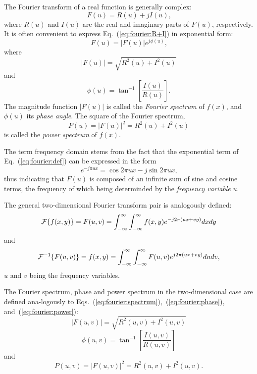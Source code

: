 The Fourier transform of a real function is generally complex:
\begin{equation}
\label{eq:fourier:R+I}
F(u)=R(u)+jI(u)\mbox{,}
\end{equation}
where $R(u)$ and $I(u)$ are the real and imaginary parts of $F(u)$,
respectively.  It is often convenient to express
Eq.~(\ref{eq:fourier:R+I}) in exponential form:
\begin{equation}
  F(u)=|F(u)|e^{j\phi(u)}\mbox{,}
\end{equation}
where
\begin{equation}
\label{eq:fourier:spectrum}
|F(u)|=\sqrt{R^{2}(u)+I^{2}(u)}
\end{equation}
and
\begin{equation}
\label{eq:fourier:phase}
\phi(u)=\tan^{-1}\left[\frac{I(u)}{R(u)}\right]\mbox{.}
\end{equation}
The magnitude function $|F(u)|$ is called the {\em Fourier spectrum\/}
of $f(x)$, and $\phi(u)$ its {\em phase angle\/}.  The square of the
Fourier spectrum,
\begin{equation}
\label{eq:fourier:power}
P(u)=|F(u)|^{2}=R^{2}(u)+I^{2}(u)
\end{equation}
is called the {\em power spectrum\/} of $f(x)$.

The term frequency domain stems from the fact that the exponential
term of Eq.~(\ref{eq:fourier:def}) can be expressed in the form
\begin{equation}
  e^{-j\pi ux}=\cos 2\pi ux-j\sin 2\pi ux\mbox{,}
\end{equation}
thus indicating that $F(u)$ is composed of an infinite sum of sine and
cosine terms, the frequency of which being determinded by the {\em
frequency variable\/} $u$.

The general two-dimensional Fourier transform pair is analogously
defined:
\begin{equation}
  {\cal F}\{f(x,y)\}=F(u,v)=\int_{-\infty}^{\infty}
  \int_{-\infty}^{\infty}f(x,y)e^{-j2\pi(ux+vy)}dxdy
\end{equation}
and
\begin{equation}
  {\cal F}^{-1}\{F(u,v)\}=f(x,y)=\int_{-\infty}^{\infty}
  \int_{-\infty}^{\infty}F(u,v)e^{j2\pi(ux+vy)}dudv\mbox{,}
\end{equation}
$u$ and $v$ being the frequency variables.

The Fourier spectrum, phase and power spectrum in the two-dimensional
case are defined ana-logously to
Eqs.~(\ref{eq:fourier:spectrum}),~(\ref{eq:fourier:phase}),
and~(\ref{eq:fourier:power}):
\begin{equation}
\label{eq:fourier:spectrum2}
|F(u,v)|=\sqrt{R^{2}(u,v)+I^{2}(u,v)}
\end{equation}
\begin{equation}
\label{eq:fourier:phase2}
\phi(u,v)=\tan^{-1}\left[\frac{I(u,v)}{R(u,v)}\right]
\end{equation}
and
\begin{equation}
\label{eq:fourier:power2}
P(u,v)=|F(u,v)|^{2}=R^{2}(u,v)+I^{2}(u,v)\mbox{.} 
\end{equation}

